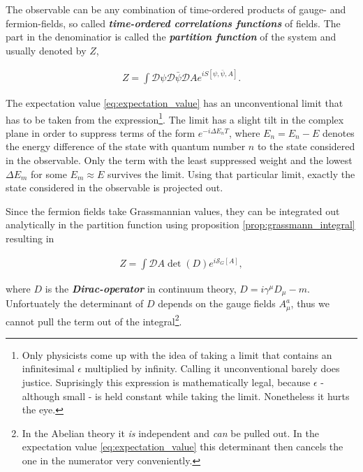 \documentclass{article}
\theoremstyle{plain} %
\theoremstyle{convention} %
\theoremstyle{remark} %
\def\df#1{\textbf{\textit{#1}}}
\numberwithin{equation}{section}
\begin{document}
The observable can be any combination of time-ordered products of gauge- and fermion-fields, so called \df{time-ordered correlations functions} of fields. The part in the denominatior is called the \df{partition function} of the system and usually denoted by $Z$,

\begin{align*}
    Z = \int \mathcal{D}\psi \mathcal{D} \bar{\psi} \mathcal{D} A e^{iS[\psi, \bar{\psi}, A]}.
\end{align*}

The expectation value \eqref{eq:expectation_value} has an unconventional limit that has to be taken from the expression\footnote{Only physicists come up with the idea of taking a limit that contains an infinitesimal $\epsilon$ multiplied by infinity. Calling it unconventional barely does justice. Suprisingly this expression is mathematically legal, because $\epsilon$ - although small - is held constant while taking the limit. Nonetheless it hurts the eye.}. The limit has a slight tilt in the complex plane in order to suppress terms of the form $e^{-i \Delta E_n T}$, where $E_n = E_n - E$ denotes the energy difference of the state with quantum number $n$ to the state considered in the observable. Only the term with the least suppressed weight and the lowest $\Delta E_m$ for some $E_m \approx E$ survives the limit. Using that particular limit, exactly the state considered in the observable is projected out.

Since the fermion fields take Grassmannian values, they can be integrated out analytically in the partition function using proposition \ref{prop:grassmann_integral} resulting in

\begin{align*}
    Z = \int \mathcal{D} A \det(D) e^{i\mathcal{S}_{G}[A]},
\end{align*}

where $D$ is the \df{Dirac-operator} in continuum theory, $D = i\gamma^{\mu} D_{\mu} - m$. Unfortuately the determinant of $D$ depends on the gauge fields $A_{\mu}^a$, thus we cannot pull the term out of the integral\footnote{In the Abelian theory it \textit{is} independent and \textit{can} be pulled out. In the expectation value \eqref{eq:expectation_value} this determinant then cancels the one in the numerator very conveniently.}.

\end{document}
